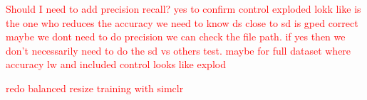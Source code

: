 \begin{table}[H]
    \centering
    \caption{Evaluation Results on Different Datasets and Augmentations with euclidean distance}
    \label{tab:evaluation_results_euclidean}
\end{table}

\textcolor{red}{Should I need to add precision recall? yes to confirm control exploded lokk like is the one who reduces the accuracy we need to know ds close to sd is 
gped correct maybe we dont need to do precision we can check the file path. if yes then we don't necessarily need to do the sd vs others test. maybe for full dataset where accuracy lw and included control looks like explod}

\textcolor{red}{redo balanced resize training with simclr}



